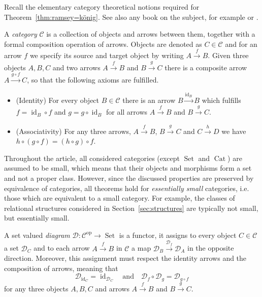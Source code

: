 \documentclass[preprint,12pt]{elsarticle}
\newcommand{\cat}[1]{\mathcal{#1}}
\newcommand{\op}{^{\mathop{op}}}
\DeclareMathOperator{\Set}{Set}
\DeclareMathOperator{\Cat}{Cat}
\DeclareMathOperator{\id}{id}
\begin{document}
Recall the elementary category theoretical notions required for Theorem~\ref{thm:ramsey=könig}. See also any book on the subject, for example \cite{borceux1994handbook} or \cite{Riehl2016context}. 

\begin{defin}
    A \emph{category} $\cat C$ is a collection of objects and arrows between them, together with a formal composition operation of arrows. Objects are denoted as $C\in\cat C$ and for an arrow $f$ we specify its source and target object by writing $A\xrightarrow{f}B$. Given three objects $A,B,C$ and two arrows $A\xrightarrow{f}B$ and $B\xrightarrow{g}C$ there is a composite arrow $A\xrightarrow{g\circ f}C$, so that the following axioms are fulfilled.
    \begin{itemize}
        \item (Identity) For every object $B\in \cat C$ there is an arrow $B\xrightarrow{\id_B}B$ which fulfills $f=\id_B\circ f$ and $g= g\circ \id_B$ for all arrows $A\xrightarrow{f}B$ and $B\xrightarrow{g}C$.
        \item (Associativity) For any three arrows, $A\xrightarrow{f}B$, $B\xrightarrow{g}C$ and $C\xrightarrow{h}D$ we have $h\circ(g\circ f) = (h\circ g)\circ f$.
    \end{itemize}
\end{defin}
Throughout the article, all considered categories (except $\Set$ and $\Cat$) are assumed to be small, which means that their objects and morphisms form a set and not a proper class. However, since the discussed properties are preserved by equivalence of categories, all theorems hold for \emph{essentially small} categories, i.e.\! those which are equivalent to a small category. For example, the classes of relational structures considered in Section~\ref{sec:structures} are typically not small, but essentially small. 

\begin{defin}
    A set valued \emph{diagram} $\cat D:\cat C\op\to\Set$ is a functor, it assigns to every object $C\in\cat C$ a set $\cat D_C$ and to each arrow $A\xrightarrow{f}B$ in $\cat C$ a map $\cat D_B\xrightarrow{\cat D_f}\cat D_A$ in the opposite direction. Moreover, this assignment must respect the identity arrows and the composition of arrows, meaning that
    $$
    \cat D_{\id_C} = \id_{\cat D_C} \quad\text{and}\quad 
    \cat D_f\circ \cat D_g = \cat D_{g\circ f}
    $$
    for any three objects $A,B,C$ and arrows $A\xrightarrow{f}B$ and $B\xrightarrow{g}C$.
\end{defin}
\end{document}
